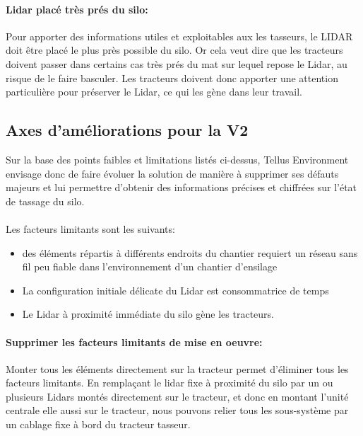 \documentclass[12pt,a4paper]{report}
\begin{document}
\paragraph{Lidar placé très prés du silo:} Pour apporter des informations utiles et exploitables aux les tasseurs, le LIDAR doit être placé le plus près possible du silo. Or cela veut dire que les tracteurs doivent passer dans certains cas très prés du mat sur lequel repose le Lidar, au risque de le faire basculer. Les tracteurs doivent donc apporter une attention particulière pour préserver le Lidar, ce qui les gène dans leur travail.

\subsection{Axes d'améliorations pour la V2}

Sur la base des points faibles et limitations listés ci-dessus, Tellus Environment envisage donc de faire évoluer la solution de manière à supprimer ses défauts majeurs et lui permettre d'obtenir des informations précises et chiffrées sur l'état de tassage du silo.

\paragraph{} Les facteurs limitants sont les suivants:

\begin{itemize}
	\item des éléments répartis à différents endroits du chantier requiert un réseau sans fil peu fiable dans l'environnement d'un chantier d'ensilage
	\item La configuration initiale délicate du Lidar est consommatrice de temps
	\item Le Lidar à proximité immédiate du silo gène les tracteurs.
\end{itemize}

\paragraph{Supprimer les facteurs limitants de mise en oeuvre:} Monter tous les éléments directement sur la tracteur permet d'éliminer tous les facteurs limitants. 
En remplaçant le lidar fixe à proximité du silo par un ou plusieurs Lidars montés directement sur le tracteur, et donc en montant l'unité centrale elle aussi sur le tracteur, nous pouvons relier tous les sous-système par un cablage fixe à bord du tracteur tasseur.
\end{document}
